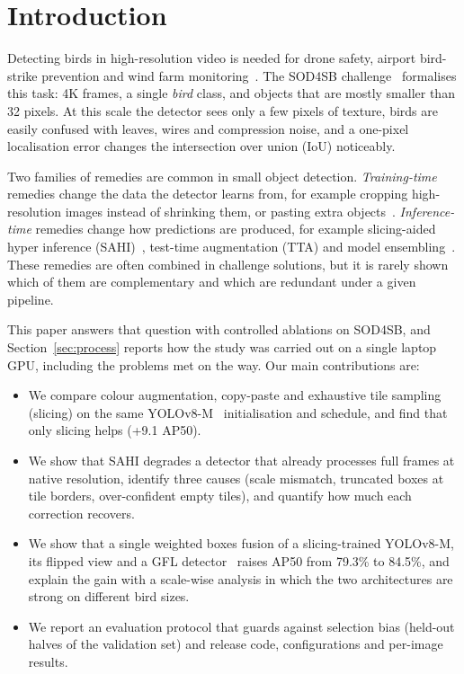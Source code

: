 \documentclass[pdflatex,sn-mathphys-num]{sn-jnl}%
\begin{document}
\section{Introduction}
Detecting birds in high-resolution video is needed for drone safety, airport bird-strike prevention and wind
farm monitoring~\cite{fujii2021distant,sun2022airbirds,yoshihashi2017windfarm}. The SOD4SB
challenge~\cite{kondo2023sod4sb} formalises this task: 4K frames, a single \emph{bird} class, and objects that
are mostly smaller than 32 pixels. At this scale the detector sees only a few pixels of texture, birds are
easily confused with leaves, wires and compression noise, and a one-pixel localisation error changes the
intersection over union (IoU) noticeably.

Two families of remedies are common in small object detection. \emph{Training-time} remedies change the data the
detector learns from, for example cropping high-resolution images instead of shrinking them, or pasting extra
objects~\cite{ghiasi2021copypaste}. \emph{Inference-time} remedies change how predictions are produced, for example
slicing-aided hyper inference (SAHI)~\cite{akyon2022sahi}, test-time augmentation (TTA) and model
ensembling~\cite{solovyev2021wbf,hou2023ensemble}. These remedies are often combined in challenge solutions,
but it is rarely shown which of them are complementary and which are redundant under a given pipeline.

This paper answers that question with controlled ablations on SOD4SB, and Section~\ref{sec:process} reports how
the study was carried out on a single laptop GPU, including the problems met on the way. Our main contributions are:
\begin{itemize}
\item We compare colour augmentation, copy-paste and exhaustive tile sampling (slicing) on the same
YOLOv8-M~\cite{jocher2023yolov8} initialisation and schedule, and find that only slicing helps (+9.1 AP50).
\item We show that SAHI degrades a detector that already processes full frames at native resolution, identify
three causes (scale mismatch, truncated boxes at tile borders, over-confident empty tiles), and quantify how much
each correction recovers.
\item We show that a single weighted boxes fusion of a slicing-trained YOLOv8-M, its flipped view and a GFL
detector~\cite{li2020gfl} raises AP50 from 79.3\% to 84.5\%, and explain the gain with a scale-wise analysis in
which the two architectures are strong on different bird sizes.
\item We report an evaluation protocol that guards against selection bias (held-out halves of the validation
set) and release code, configurations and per-image results.
\end{itemize}
\end{document}
